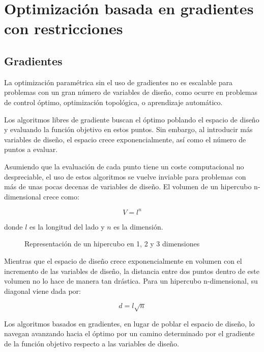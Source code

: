 \section{Optimización basada en gradientes con restricciones}

\subsection{Gradientes}

La optimización paramétrica sin el uso de gradientes no es escalable para
problemas con un gran número de variables de diseño, como ocurre en problemas
de control óptimo, optimización topológica, o aprendizaje automático.

Los algoritmos libres de gradiente buscan el óptimo poblando el espacio de
diseño y evaluando la función objetivo en estos puntos. Sin embargo, al
introducir más variables de diseño, el espacio crece exponencialmente, así como
el número de puntos a evaluar.

Asumiendo que la evaluación de cada punto tiene un coste computacional no
despreciable, el uso de estos algoritmos se vuelve inviable para problemas con
más de unas pocas decenas de variables de diseño. El volumen de un hipercubo
n-dimensional crece como:

\begin{equation}
	V = l^n
\end{equation}

donde $l$ es la longitud del lado y $n$ es la dimensión.

\begin{figure}[h] \centering
	\caption{Representación de un hipercubo en 1, 2 y 3 dimensiones}
	\label{fig:hypercube}
\end{figure}

Mientras que el espacio de diseño crece exponencialmente en volumen con el
incremento de las variables de diseño, la distancia entre dos puntos dentro
de este volumen no lo hace de manera tan drástica. Para un hipercubo
n-dimensional, su diagonal viene dada por:

\begin{equation}
	d = l\sqrt{n}
\end{equation}

Los algoritmos basados en gradientes, en lugar de poblar el espacio de
diseño, lo navegan avanzando hacia el óptimo por un camino determinado por
el gradiente de la función objetivo respecto a las variables de diseño.

